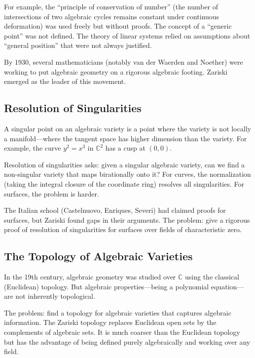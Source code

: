 For example, the ``principle of conservation of number'' (the number of intersections of two algebraic cycles remains constant under continuous deformation) was used freely but without proofs. The concept of a ``generic point'' was not defined. The theory of linear systems relied on assumptions about ``general position'' that were not always justified.

By 1930, several mathematicians (notably van der Waerden and Noether) were working to put algebraic geometry on a rigorous algebraic footing. Zariski emerged as the leader of this movement.

\subsection{Resolution of Singularities}

A singular point on an algebraic variety is a point where the variety is not locally a manifold---where the tangent space has higher dimension than the variety. For example, the curve $y^2 = x^3$ in $\mathbb{C}^2$ has a cusp at $(0,0)$.

Resolution of singularities asks: given a singular algebraic variety, can we find a non-singular variety that maps birationally onto it? For curves, the normalization (taking the integral closure of the coordinate ring) resolves all singularities. For surfaces, the problem is harder.

The Italian school (Castelnuovo, Enriques, Severi) had claimed proofs for surfaces, but Zariski found gaps in their arguments. The problem: give a rigorous proof of resolution of singularities for surfaces over fields of characteristic zero.

\subsection{The Topology of Algebraic Varieties}

In the 19th century, algebraic geometry was studied over $\mathbb{C}$ using the classical (Euclidean) topology. But algebraic properties---being a polynomial equation---are not inherently topological.

The problem: find a topology for algebraic varieties that captures algebraic information. The Zariski topology replaces Euclidean open sets by the complements of algebraic sets. It is much coarser than the Euclidean topology but has the advantage of being defined purely algebraically and working over any field.

